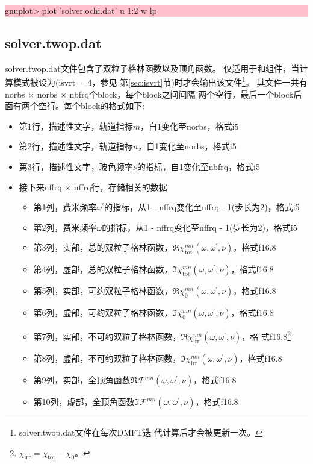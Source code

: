 \noindent\colorbox{pink}{\parbox[r]{\linewidth}{\quad gnuplot> plot 'solver.ochi.dat' u 1:2 w lp }}

\subsection{solver.twop.dat}
solver.twop.dat文件包含了双粒子格林函数以及顶角函数。
仅适用于{\gardenia}和{\narcissus}组件，当计算模式被设为(isvrt = 4，参见
第\ref{sec:isvrt}节)时才会输出该文件\footnote{solver.twop.dat文件在每次DMFT迭
代计算后才会被更新一次。}。
其文件一共有norbs $\times$ norbs $\times$ nbfrq个block，每个block之间间隔
两个空行，最后一个block后面有两个空行。每个block的格式如下:
\begin{itemize}
\item 第1行，描述性文字，轨道指标$m$，自1变化至norbs，格式i5
\item 第2行，描述性文字，轨道指标$n$，自1变化至norbs，格式i5
\item 第3行，描述性文字，玻色频率$\nu$的指标，自1变化至nbfrq，格式i5
\item 接下来nffrq $\times$ nffrq行，存储相关的数据
    \begin{itemize}
    \item 第1列，费米频率$\omega^{\prime}$的指标，从1 - nffrq变化至nffrq - 1(步长为2)，格式i5
    \item 第2列，费米频率$\omega$的指标，从1 - nffrq变化至nffrq - 1(步长为2)，格式i5
    \item 第3列，实部，总的双粒子格林函数，$\Re\chi^{mn}_{\text{tot}}(\omega,\omega^{\prime},\nu)$，格式f16.8
    \item 第4列，虚部，总的双粒子格林函数，$\Im\chi^{mn}_{\text{tot}}(\omega,\omega^{\prime},\nu)$，格式f16.8
    \item 第5列，实部，可约双粒子格林函数，$\Re\chi^{mn}_{0}(\omega,\omega^{\prime},\nu)$，格式f16.8
    \item 第6列，虚部，可约双粒子格林函数，$\Im\chi^{mn}_{0}(\omega,\omega^{\prime},\nu)$，格式f16.8
    \item 第7列，实部，不可约双粒子格林函数，$\Re\chi^{mn}_{\text{irr}}(\omega,\omega^{\prime},\nu)$，格
          式f16.8\footnote{$\chi_{\text{irr}} = \chi_{\text{tot}} - \chi_{0}$。}
    \item 第8列，虚部，不可约双粒子格林函数，$\Im\chi^{mn}_{\text{irr}}(\omega,\omega^{\prime},\nu)$，格式f16.8
    \item 第9列，实部，全顶角函数$\Re\mathcal{F}^{mn}(\omega,\omega^{\prime},\nu)$，格式f16.8
    \item 第10列，虚部，全顶角函数$\Im\mathcal{F}^{mn}(\omega,\omega^{\prime},\nu)$，格式f16.8
    \end{itemize}
\end{itemize}

